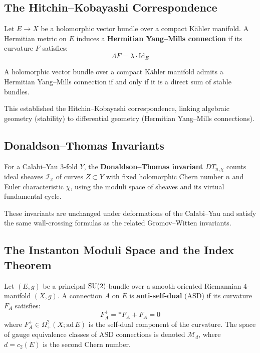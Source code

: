 \subsection{The Hitchin--Kobayashi Correspondence}

\begin{definition}
Let $E \to X$ be a holomorphic vector bundle over a compact K\"ahler manifold. A Hermitian metric on $E$ induces a \textbf{Hermitian Yang--Mills connection} if its curvature $F$ satisfies:
\[
\Lambda F = \lambda \cdot \mathrm{Id}_E
\]
\end{definition}

\begin{theorem}
A holomorphic vector bundle over a compact K\"ahler manifold admits a Hermitian Yang--Mills connection if and only if it is a direct sum of stable bundles.
\end{theorem}

This established the Hitchin--Kobayashi correspondence, linking algebraic geometry (stability) to differential geometry (Hermitian Yang--Mills connections).

\subsection{Donaldson--Thomas Invariants}

\begin{definition}
For a Calabi--Yau 3-fold $Y$, the \textbf{Donaldson--Thomas invariant} $DT_{n,\chi}$ counts ideal sheaves $\mathcal{I}_Z$ of curves $Z \subset Y$ with fixed holomorphic Chern number $n$ and Euler characteristic $\chi$, using the moduli space of sheaves and its virtual fundamental cycle.
\end{definition}

These invariants are unchanged under deformations of the Calabi--Yau and satisfy the same wall-crossing formulas as the related Gromov--Witten invariants.

\subsection{The Instanton Moduli Space and the Index Theorem}

\begin{definition}
Let $(E, g)$ be a principal $\operatorname{SU}(2)$-bundle over a smooth oriented Riemannian 4-manifold $(X, g)$. A connection $A$ on $E$ is \textbf{anti-self-dual} (ASD) if its curvature $F_A$ satisfies:
\[
F_A^+ = *F_A + F_A = 0
\]
where $F_A^+ \in \Omega^2_+(X; \mathrm{ad}\, E)$ is the self-dual component of the curvature. The space of gauge equivalence classes of ASD connections is denoted $\mathcal{M}_d$, where $d = c_2(E)$ is the second Chern number.
\end{definition}

